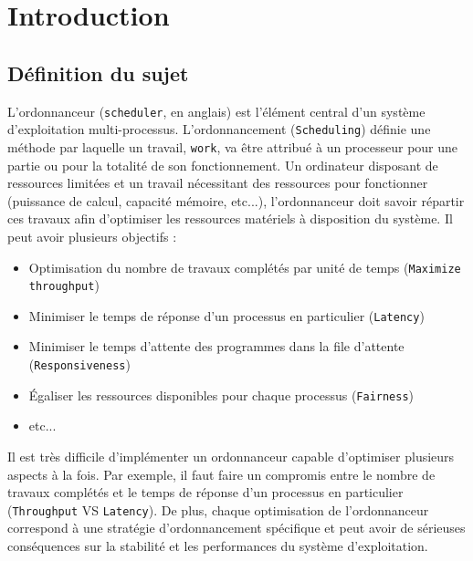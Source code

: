\documentclass[a4paper,11pt,final]{report}
\author{ESPIGOLE Simon & Gilbert Teddy & Hugo Legrand}
\begin{document}


\tableofcontents

\newpage

\chapter{Introduction}
    \section{Définition du sujet}
    
    L'ordonnanceur (\texttt{scheduler}, en anglais) est l'élément central d'un système d'exploitation multi-processus. L'ordonnancement (\texttt{Scheduling}) définie une méthode par laquelle un travail, \texttt{work}, va être attribué à un processeur pour une partie ou pour la totalité de son fonctionnement. Un ordinateur disposant de ressources limitées et un travail nécessitant des ressources pour fonctionner (puissance de calcul, capacité mémoire, etc...), l'ordonnanceur doit savoir répartir ces travaux afin d'optimiser les ressources matériels à disposition du système. Il peut avoir plusieurs objectifs : 
    
   
    
    \begin{itemize}
        \item Optimisation du nombre de travaux complétés par unité de temps (\texttt{Maximize throughput})
        \item Minimiser le temps de réponse d'un processus en particulier (\texttt{Latency})
        \item Minimiser le temps d'attente des programmes dans la file d'attente (\texttt{Responsiveness})
        \item Égaliser les ressources disponibles pour chaque processus (\texttt{Fairness})
        \item etc...
    \end{itemize}
    
    Il est très difficile d'implémenter un ordonnanceur capable d'optimiser plusieurs aspects à la fois. Par exemple, il faut faire un compromis entre le nombre de travaux complétés et le temps de réponse d'un processus en particulier (\texttt{Throughput} VS \texttt{Latency}). De plus, chaque optimisation de l'ordonnanceur correspond à une stratégie d'ordonnancement spécifique et peut avoir de sérieuses conséquences sur la stabilité et les performances du système d'exploitation.
    
\end{document}
